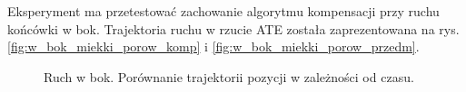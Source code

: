 Eksperyment ma przetestować zachowanie algorytmu kompensacji przy ruchu końcówki w bok. Trajektoria ruchu w rzucie ATE została zaprezentowana na rys. \ref{fig:w_bok_miekki_porow_komp} i \ref{fig:w_bok_miekki_porow_przedm}.
\begin{figure}[H]
	\centering
	\hfill
	
	\hfill

	\caption{Ruch w bok. Porównanie trajektorii pozycji w zależności od czasu.}
	\label{fig:w_bok_miekki_a}

\end{figure}

